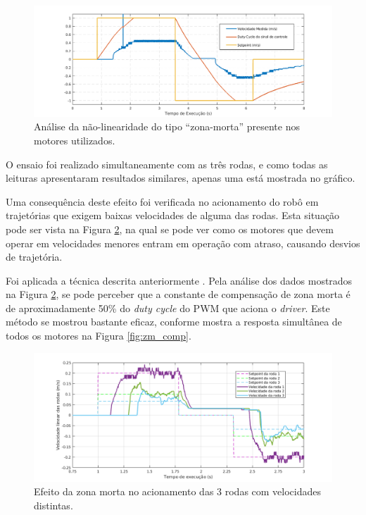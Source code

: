 \begin{figure}[h]
  \centering
  \includegraphics[width = \textwidth]{imagens/zonamorta}
  \caption{Análise da não-linearidade do tipo ``zona-morta'' presente nos motores utilizados.}
  \label{fig:zonamorta}
\end{figure}

O ensaio foi realizado simultaneamente com as três rodas, e como todas as leituras apresentaram resultados similares, apenas uma está mostrada no gráfico.

Uma consequência deste efeito foi verificada no acionamento do robô em trajetórias que exigem baixas velocidades de alguma das rodas. Esta situação pode ser vista na Figura \ref{fig:zm3rodas}, na qual se pode ver como os motores que devem operar em velocidades menores entram em operação com atraso, causando desvios de trajetória.

Foi aplicada a técnica descrita anteriormente \citep{cunha2001zm}. Pela análise dos dados mostrados na Figura \ref{fig:zm3rodas}, se pode perceber que a constante de compensação de zona morta é de aproximadamente 50\% do \textit{duty cycle} do PWM que aciona o \textit{driver}. Este método se mostrou bastante eficaz, conforme mostra a resposta simultânea de todos os motores na Figura \ref{fig:zm_comp}.

\begin{figure}[h!]
  \centering
  \includegraphics[width = \textwidth]{imagens/zm3rodas}
  \caption{Efeito da zona morta no acionamento das 3 rodas com velocidades distintas.}
  \label{fig:zm3rodas}
\end{figure}


